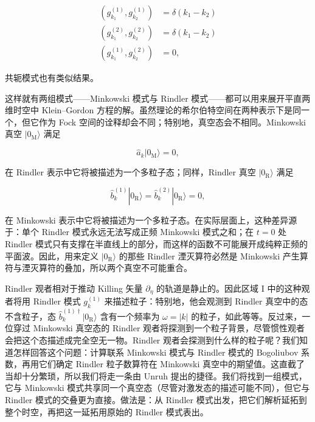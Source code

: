 \begin{align*}
(g_{k_1}^{(1)}, g_{k_2}^{(1)}) &= \delta(k_1 - k_2) \\
(g_{k_1}^{(2)}, g_{k_2}^{(2)}) &= \delta(k_1 - k_2) \\
(g_{k_1}^{(1)}, g_{k_2}^{(2)}) &= 0,
\tag{9.148}
\end{align*}

共轭模式也有类似结果。

这样就有两组模式——Minkowski 模式与 Rindler 模式——都可以用来展开平直两维时空中 Klein--Gordon 方程的解。虽然理论的希尔伯特空间在两种表示下是同一个，但它作为 Fock 空间的诠释却会不同；特别地，真空态会不相同。Minkowski 真空 $|0_{\mathrm{M}}\rangle$ 满足

\begin{equation*}
\hat{a}_{k}|0_{\mathrm{M}}\rangle = 0,
\tag{9.149}
\end{equation*}

在 Rindler 表示中它将被描述为一个多粒子态；同样，Rindler 真空 $|0_{\mathrm{R}}\rangle$ 满足

\begin{equation*}
\hat{b}_{k}^{(1)}|0_{\mathrm{R}}\rangle = \hat{b}_{k}^{(2)}|0_{\mathrm{R}}\rangle = 0,
\tag{9.150}
\end{equation*}

在 Minkowski 表示中它将被描述为一个多粒子态。在实际层面上，这种差异源于：单个 Rindler 模式永远无法写成正频 Minkowski 模式之和；在 $t=0$ 处 Rindler 模式只有支撑在半直线上的部分，而这样的函数不可能展开成纯粹正频的平面波。因此，用来定义 $|0_{\mathrm{R}}\rangle$ 的那些 Rindler 湮灭算符必然是 Minkowski 产生算符与湮灭算符的叠加，所以两个真空不可能重合。

Rindler 观者相对于推动 Killing 矢量 $\partial_{\eta}$ 的轨道是静止的。因此区域 I 中的这种观者将用 Rindler 模式 $g_{k}^{(1)}$ 来描述粒子：特别地，他会观测到 Rindler 真空中的态不含粒子，态 $\hat{b}_{k}^{(1)\dagger}|0_{\mathrm{R}}\rangle$ 含有一个频率为 $\omega=|k|$ 的粒子，如此等等。反过来，一位穿过 Minkowski 真空态的 Rindler 观者将探测到一个粒子背景，尽管惯性观者会把这个态描述成完全空无一物。Rindler 观者会探测到什么样的粒子呢？我们知道怎样回答这个问题：计算联系 Minkowski 模式与 Rindler 模式的 Bogoliubov 系数，再用它们确定 Rindler 粒子数算符在 Minkowski 真空中的期望值。这直截了当却十分繁琐，所以我们将走一条由 Unruh 提出的捷径。我们将找到一组模式，它与 Minkowski 模式共享同一个真空态（尽管对激发态的描述可能不同），但它与 Rindler 模式的交叠更为直接。做法是：从 Rindler 模式出发，把它们解析延拓到整个时空，再把这一延拓用原始的 Rindler 模式表出。

